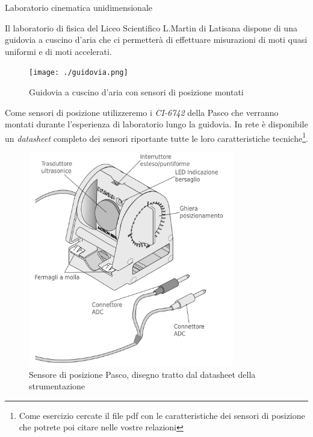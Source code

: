 \documentclass[a4paper,10pt,oneside]{article}
\begin{document}
{\huge Laboratorio cinematica unidimensionale}
\begin{abstract}
 La cinematica, dal greco \textgreek{κινεῖν} (velocità) è quella branca della fisica che si occupa di descrivere il moto degli oggetti a prescindere dalla cause che lo hanno provocato. In questa esperienza andremo  ad osservare il moto unidimensionale di un oggetto e misureremo la sua posizione rispetto ad un sistema di riferimento solidale ai sensori ad ultrasuoni presenti in laboratorio. Utilizzeremo quindi i dati acquisiti per calcolare la velocità e l'accelerazione dell'oggetto.
\end{abstract}


\vspace{2cm}

Il laboratorio di fisica del Liceo Scientifico L.Martin di Latisana dispone di una guidovia a cuscino d'aria che ci permetterà di effettuare misurazioni di moti quasi uniformi e di moti accelerati.

\begin{figure}[H]
 \centering
 \texttt{[image: ./guidovia.png]}
 \caption{Guidovia a cuscino d'aria con sensori di posizione montati}
 \label{fig:guidovia_cuscino}
\end{figure}

Come sensori di posizione utilizzeremo i \textsl{CI-6742} della Pasco che verranno montati durante l'esperienza di laboratorio lungo la guidovia. In rete è disponibile un \emph{datasheet} completo dei sensori riportante tutte le loro caratteristiche tecniche\footnote{Come esercizio cercate il file pdf con le caratteristiche dei sensori di posizione che potrete poi citare nelle vostre relazioni}.

\begin{figure}[H]
 \centering
 \includegraphics[width=0.8\textwidth]{./sensore_moto_pasco.png}
 \caption{Sensore di posizione Pasco, disegno tratto dal datasheet della strumentazione}
 \label{fig:Pasco_sensore1}
\end{figure}
\end{document}
